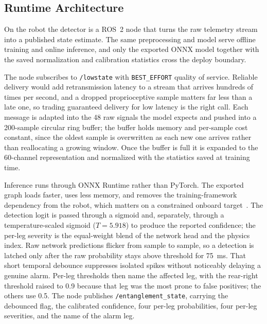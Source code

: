 \subsection{Runtime Architecture}
\label{sec:runtime}

On the robot the detector is a ROS~2 node that turns the raw telemetry stream into a published
state estimate. The same preprocessing and model serve offline training and online inference, and only the exported ONNX model together with the saved normalization and calibration statistics cross the deploy boundary.

The node subscribes to \texttt{/lowstate} with \texttt{BEST\_EFFORT} quality of service. Reliable
delivery would add retransmission latency to a stream that arrives hundreds of times per second, and
a dropped proprioceptive sample matters far less than a late one, so trading guaranteed delivery for
low latency is the right call. Each message is adapted into the 48 raw signals the model expects and
pushed into a 200-sample circular ring buffer; the buffer holds memory and per-sample cost constant,
since the oldest sample is overwritten as each new one arrives rather than reallocating a growing
window. Once the buffer is full it is expanded to the 60-channel representation and normalized with
the statistics saved at training time.

Inference runs through ONNX Runtime rather than PyTorch. The exported graph loads faster, uses less
memory, and removes the training-framework dependency from the robot, which matters on a constrained
onboard target~\cite{onnxruntime,macenski2022ros2}. The detection logit is passed through a sigmoid
and, separately, through a temperature-scaled sigmoid ($T=5.918$) to produce the reported confidence;
the per-leg severity is the equal-weight blend of the network head and the physics index. Raw network
predictions flicker from sample to sample, so a detection is latched only after the raw probability
stays above threshold for 75~ms. That short temporal debounce suppresses isolated spikes without
noticeably delaying a genuine alarm. Per-leg thresholds then name the affected leg, with the
rear-right threshold raised to 0.9 because that leg was the most prone to false positives; the others
use 0.5. The node publishes
\texttt{/entanglement\_state}, carrying the debounced flag, the calibrated confidence, four per-leg
probabilities, four per-leg severities, and the name of the alarm leg.

